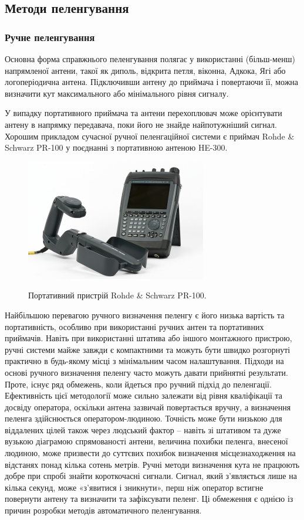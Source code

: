 \documentclass{article}
\begin{document}
\subsection{Методи пеленгування}
 
\subsubsection{Ручне пеленгування}
Основна форма справжнього пеленгування полягає у використанні (більш-менш) напрямленої антени, такої як диполь, відкрита петля, віконна, Адкока, Ягі або логоперіодична антена. Підключивши антену до приймача і повертаючи її, можна визначити кут максимального або мінімального рівня сигналу.

У випадку портативного приймача та антени перехоплювач може орієнтувати антену в напрямку передавача, поки його не знайде найпотужніший сигнал. Хорошим прикладом сучасної ручної пеленгаційної системи є приймач Rohde \& Schwarz PR-100 у поєднанні з портативною антеною HE-300. 

\begin{figure}[H]
\centering
{\includegraphics[width=0.6\linewidth]{images/rds-rs-100.jpg}}
\caption{\label{fig:rds:pr100}Портативний пристрій Rohde \& Schwarz PR-100.}
\end{figure}

Найбільшою перевагою ручного визначення пеленгу є його низька вартість та портативність, особливо при використанні ручних антен та портативних приймачів. Навіть при використанні штатива або іншого монтажного пристрою, ручні системи майже завжди є компактними та можуть бути швидко розгорнуті практично в будь-якому місці з мінімальним часом налаштування. Підходи на основі ручного визначення пеленгу часто можуть давати прийнятні результати. Проте, існує ряд обмежень, коли йдеться про ручний підхід до пеленгації. Ефективність цієї методології може сильно залежати від рівня кваліфікації та досвіду оператора, оскільки антена зазвичай повертається вручну, а визначення пеленга здійснюється оператором-людиною. Точність може бути низькою для віддалених цілей також через людський фактор – навіть зі штативом та дуже вузькою діаграмою спрямованості антени, величина похибки пеленга, внесеної людиною, може призвести до суттєвих похибок визначення місцезнаходження на відстанях понад кілька сотень метрів. Ручні методи визначення кута не працюють добре при спробі знайти короткочасні сигнали. Сигнал, який з'являється лише на кілька секунд, може «з'явитися і зникнути», перш ніж оператор встигне повернути антену та визначити та зафіксувати пеленг. Ці обмеження є однією із причин розробки методів автоматичного пеленгування.
\end{document}
